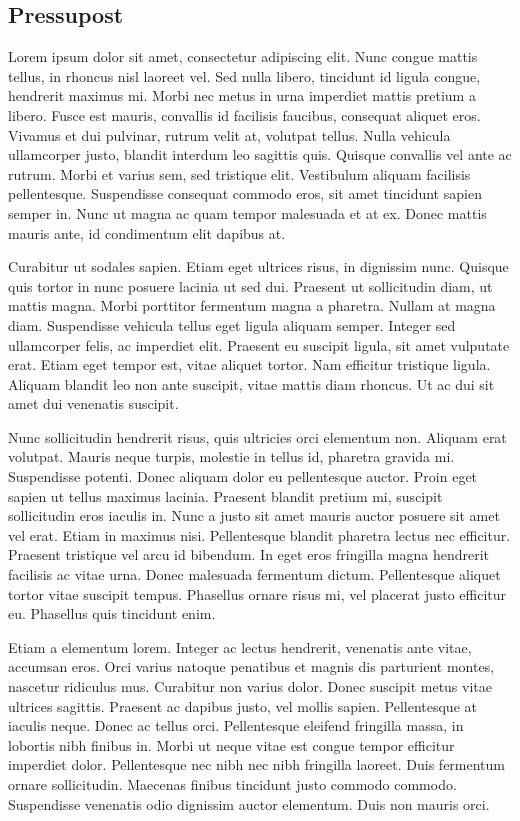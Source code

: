 \documentclass[a4paper,12pt,twoside]{ThesisStyle}
\begin{document}
\begin{appendices}

\chapter{Pressupost}

Lorem ipsum dolor sit amet, consectetur adipiscing elit. Nunc congue mattis tellus, in rhoncus nisl laoreet vel. Sed nulla libero, tincidunt id ligula congue, hendrerit maximus mi. Morbi nec metus in urna imperdiet mattis pretium a libero. Fusce est mauris, convallis id facilisis faucibus, consequat aliquet eros. Vivamus et dui pulvinar, rutrum velit at, volutpat tellus. Nulla vehicula ullamcorper justo, blandit interdum leo sagittis quis. Quisque convallis vel ante ac rutrum. Morbi et varius sem, sed tristique elit. Vestibulum aliquam facilisis pellentesque. Suspendisse consequat commodo eros, sit amet tincidunt sapien semper in. Nunc ut magna ac quam tempor malesuada et at ex. Donec mattis mauris ante, id condimentum elit dapibus at.

Curabitur ut sodales sapien. Etiam eget ultrices risus, in dignissim nunc. Quisque quis tortor in nunc posuere lacinia ut sed dui. Praesent ut sollicitudin diam, ut mattis magna. Morbi porttitor fermentum magna a pharetra. Nullam at magna diam. Suspendisse vehicula tellus eget ligula aliquam semper. Integer sed ullamcorper felis, ac imperdiet elit. Praesent eu suscipit ligula, sit amet vulputate erat. Etiam eget tempor est, vitae aliquet tortor. Nam efficitur tristique ligula. Aliquam blandit leo non ante suscipit, vitae mattis diam rhoncus. Ut ac dui sit amet dui venenatis suscipit.

Nunc sollicitudin hendrerit risus, quis ultricies orci elementum non. Aliquam erat volutpat. Mauris neque turpis, molestie in tellus id, pharetra gravida mi. Suspendisse potenti. Donec aliquam dolor eu pellentesque auctor. Proin eget sapien ut tellus maximus lacinia. Praesent blandit pretium mi, suscipit sollicitudin eros iaculis in. Nunc a justo sit amet mauris auctor posuere sit amet vel erat. Etiam in maximus nisi. Pellentesque blandit pharetra lectus nec efficitur. Praesent tristique vel arcu id bibendum. In eget eros fringilla magna hendrerit facilisis ac vitae urna. Donec malesuada fermentum dictum. Pellentesque aliquet tortor vitae suscipit tempus. Phasellus ornare risus mi, vel placerat justo efficitur eu. Phasellus quis tincidunt enim.

Etiam a elementum lorem. Integer ac lectus hendrerit, venenatis ante vitae, accumsan eros. Orci varius natoque penatibus et magnis dis parturient montes, nascetur ridiculus mus. Curabitur non varius dolor. Donec suscipit metus vitae ultrices sagittis. Praesent ac dapibus justo, vel mollis sapien. Pellentesque at iaculis neque. Donec ac tellus orci. Pellentesque eleifend fringilla massa, in lobortis nibh finibus in. Morbi ut neque vitae est congue tempor efficitur imperdiet dolor. Pellentesque nec nibh nec nibh fringilla laoreet. Duis fermentum ornare sollicitudin. Maecenas finibus tincidunt justo commodo commodo. Suspendisse venenatis odio dignissim auctor elementum. Duis non mauris orci.


\end{appendices}
\end{document}
